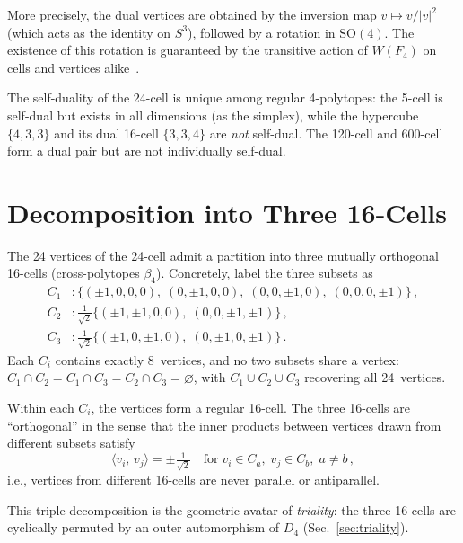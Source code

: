 \documentclass[amsmath,amssymb,aps,prd,twocolumn,superscriptaddress,nofootinbib]{revtex4-2}
\begin{document}
More precisely, the dual vertices are obtained by the inversion map
$v \mapsto v/|v|^2$ (which acts as the identity on $S^3$), followed by a
rotation in $\mathrm{SO}(4)$.  The existence of this rotation is guaranteed by
the transitive action of $W(F_4)$ on cells and vertices alike~\cite{Coxeter1973}.

The self-duality of the 24-cell is unique among regular 4-polytopes: the
5-cell is self-dual but exists in all dimensions (as the simplex), while the
hypercube $\{4,3,3\}$ and its dual 16-cell $\{3,3,4\}$ are \emph{not}
self-dual.  The 120-cell and 600-cell form a dual pair but are not individually
self-dual.

\section{Decomposition into Three 16-Cells}\label{sec:decomp}

The 24 vertices of the 24-cell admit a partition into three mutually orthogonal
16-cells (cross-polytopes $\beta_4$).  Concretely, label the three subsets as
\begin{align}
  C_1 &: \{(\pm1,0,0,0),\;(0,\pm1,0,0),\;(0,0,\pm1,0),\;(0,0,0,\pm1)\}\,,
         \label{eq:C1}\\[3pt]
  C_2 &: \tfrac{1}{\sqrt{2}}\{(\pm1,\pm1,0,0),\;(0,0,\pm1,\pm1)\}\,,
         \label{eq:C2}\\[3pt]
  C_3 &: \tfrac{1}{\sqrt{2}}\{(\pm1,0,\pm1,0),\;(0,\pm1,0,\pm1)\}\,.
         \label{eq:C3}
\end{align}
Each $C_i$ contains exactly 8~vertices, and no two subsets share a vertex:
$C_1 \cap C_2 = C_1 \cap C_3 = C_2 \cap C_3 = \varnothing$, with
$C_1 \cup C_2 \cup C_3$ recovering all 24~vertices.

Within each $C_i$, the vertices form a regular 16-cell.  The three 16-cells are
``orthogonal'' in the sense that the inner products between vertices drawn from
different subsets satisfy
\begin{equation}\label{eq:ortho}
  \langle v_i,\, v_j \rangle = \pm\tfrac{1}{\sqrt{2}}
  \quad\text{for}\; v_i \in C_a,\; v_j \in C_b,\; a \neq b\,,
\end{equation}
i.e., vertices from different 16-cells are never parallel or antiparallel.

This triple decomposition is the geometric avatar of \emph{triality}: the three
16-cells are cyclically permuted by an outer automorphism of $D_4$
(Sec.~\ref{sec:triality}).
\end{document}
